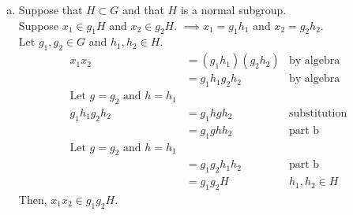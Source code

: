 \begin{enumerate}[(a)]
\item
Suppose that $H \subset G$ and that $H$ is a normal subgroup.  
\\
Suppose $x_1 \in g_1H$ and $x_2 \in g_2H$. $\implies x_1 = g_1h_1$ and $x_2 = g_2h_2$.
\\
Let $g_1, g_2 \in G$ and $h_1, h_2 \in H$.
\\
\begin{align*}
x_1x_2 &= (g_1h_1)(g_2h_2) &\text{by algebra}
\\
&= g_1h_1g_2h_2 &\text{by algebra}
\\
\text{Let\ } g = g_2 \text{\ and\ } h = h_1
\\
 g_1h_1g_2h_2 &= g_1hgh_2 &\text{substitution}
\\
&= g_1ghh_2 &\text{part b}
\\
\text{Let\ } g = g_2 \text{\ and\ } h = h_1
\\
&= g_1g_2h_1h_2 &\text{part b}
\\
&= g_1g_2H &h_1, h_2 \in H 
\end{align*}
Then, $x_1x_2 \in g_1g_2H$.

\end{enumerate}

